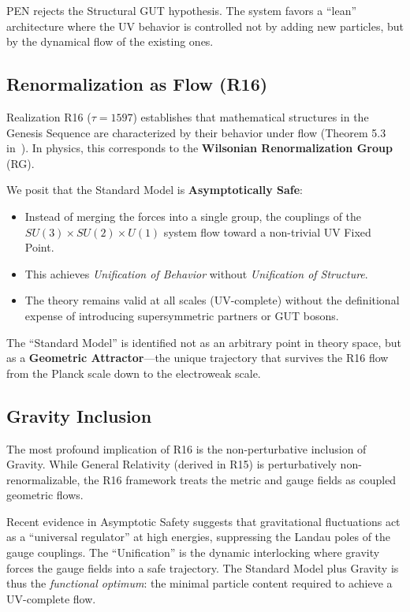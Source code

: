 \documentclass[12pt,a4paper]{article}
\theoremstyle{definition}
\newcommand{\SM}{SU(3) \times SU(2) \times U(1)}
\begin{document}
PEN rejects the Structural GUT hypothesis. The system favors a ``lean'' architecture where the UV behavior is controlled not by adding new particles, but by the dynamical flow of the existing ones.

\subsection{Renormalization as Flow (R16)}

Realization R16 ($\tau=1597$) establishes that mathematical structures in the Genesis Sequence are characterized by their behavior under flow (Theorem 5.3 in~\cite{genesis}). In physics, this corresponds to the \textbf{Wilsonian Renormalization Group} (RG).

We posit that the Standard Model is \textbf{Asymptotically Safe}:
\begin{itemize}[leftmargin=2em]
    \item Instead of merging the forces into a single group, the couplings of the $\SM$ system flow toward a non-trivial UV Fixed Point.
    \item This achieves \emph{Unification of Behavior} without \emph{Unification of Structure}.
    \item The theory remains valid at all scales (UV-complete) without the definitional expense of introducing supersymmetric partners or GUT bosons.
\end{itemize}

The ``Standard Model'' is identified not as an arbitrary point in theory space, but as a \textbf{Geometric Attractor}—the unique trajectory that survives the R16 flow from the Planck scale down to the electroweak scale.

\subsection{Gravity Inclusion}

The most profound implication of R16 is the non-perturbative inclusion of Gravity. While General Relativity (derived in R15) is perturbatively non-renormalizable, the R16 framework treats the metric and gauge fields as coupled geometric flows.

Recent evidence in Asymptotic Safety suggests that gravitational fluctuations act as a ``universal regulator'' at high energies, suppressing the Landau poles of the gauge couplings. The ``Unification'' is the dynamic interlocking where gravity forces the gauge fields into a safe trajectory. The Standard Model plus Gravity is thus the \emph{functional optimum}: the minimal particle content required to achieve a UV-complete flow.
\end{document}
